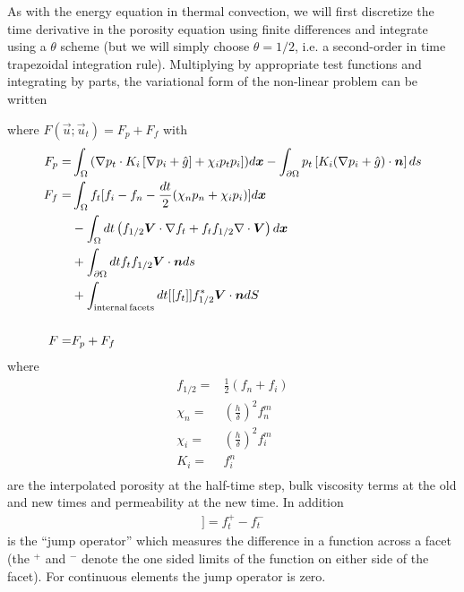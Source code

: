 As with the energy equation in thermal convection, we will first
discretize the time derivative in the porosity equation using finite
differences and integrate using a $\theta$ scheme (but we will simply
choose $\theta=1/2$, i.e. a second-order in time trapezoidal integration rule).  
Multiplying by appropriate test functions and integrating by parts, the
variational form of the non-linear problem can be written
\begin{quote}
\end{quote}
 where $F(\vec{u};\vec{u}_{t}) = F_{p} + F_{f}$ with
\begin{align}
         F_{p} =  & \int_\Omega \left(
\nabla p_{t}\cdot K_{i}
                    \left[
                    \nabla p_{i} + \hat{g}
                    \right] 
+ \chi_{i}p_{t}p_{i}
 \right])d{\mbox{\boldmath$x$}}  - \int_{\partial\Omega} p_{t}
                    \left[
                    K_{i}(\nabla p_{i} + \hat{g})\cdot{\mbox{\boldmath$n$}}
                    \right] ds\\
 F_{f} =& \int_\Omega f_{t}[ f_{i} -f_{n}
          -\frac{dt}{2}(\chi_{n}p_{n}+\chi_{i}p_{i})]d{\mbox{\boldmath$x$}}
          \nonumber\\
          & -\int_{\Omega} 
            dt\left(
            f_{1/2}{\mbox{\boldmath$V$}}\cdot\nabla f_{t}
            +f_{t}f_{1/2}\nabla\cdot{\mbox{\boldmath$V$}}
            \right)d{\mbox{\boldmath$x$}}\nonumber\\
          & + \int_{\partial\Omega}dt f_{t}f_{1/2}{\mbox{\boldmath$V$}}\cdot{\mbox{\boldmath$n$}} ds
            \nonumber\\
          & + \int_{\mathrm{internal\,  facets}} dt [[f_{t}]]f_{1/2}^{*}{\mbox{\boldmath$V$}}\cdot{\mbox{\boldmath$n$}}dS\label{eq:5.5}\\
\nonumber \\
  F = & F_{p} + F_{f} \label{eq:5.systemresidual}
\end{align}
where 
\begin{align*}
  f_{1/2} = & \frac{1}{2}(f_{n} + f_{i})\\
  \chi_n = & 
             \left(
             \frac{h}{\delta}
             \right)^{2}f_{n}^{m}\\
\chi_i = & 
             \left(
             \frac{h}{\delta}
             \right)^{2}f_{i}^{m}\\
K_{i}    = & f_{i}^{n}\\
\end{align*}
are the interpolated porosity at the half-time step, bulk viscosity
terms at the old and new times and permeability at the new time. In
addition
\begin{align*}
  [[f_{t}]] = f_{t}^{+} - f_{t}^{-}
\end{align*}
is the ``jump operator'' which 
measures the difference in a function across a facet (the $^{+}$ and
$^{-}$ denote the one sided limits of the function on either side of
the facet).  For continuous elements the jump operator is zero.

